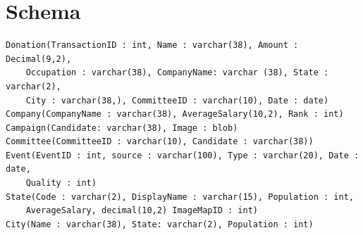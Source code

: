 \documentclass[12pt]{article}
\begin{document}
\section{Schema}
\begin{verbatim}
Donation(TransactionID : int, Name : varchar(38), Amount : Decimal(9,2), 
    Occupation : varchar(38), CompanyName: varchar (38), State : varchar(2),
    City : varchar(38,), CommitteeID : varchar(10), Date : date)
Company(CompanyName : varchar(38), AverageSalary(10,2), Rank : int) 
Campaign(Candidate: varchar(38), Image : blob)
Committee(CommitteeID : varchar(10), Candidate : varchar(38))
Event(EventID : int, source : varchar(100), Type : varchar(20), Date : date, 
    Quality : int)
State(Code : varchar(2), DisplayName : varchar(15), Population : int, 
    AverageSalary, decimal(10,2) ImageMapID : int)
City(Name : varchar(38), State: varchar(2), Population : int)
\end{verbatim}
\end{document}
